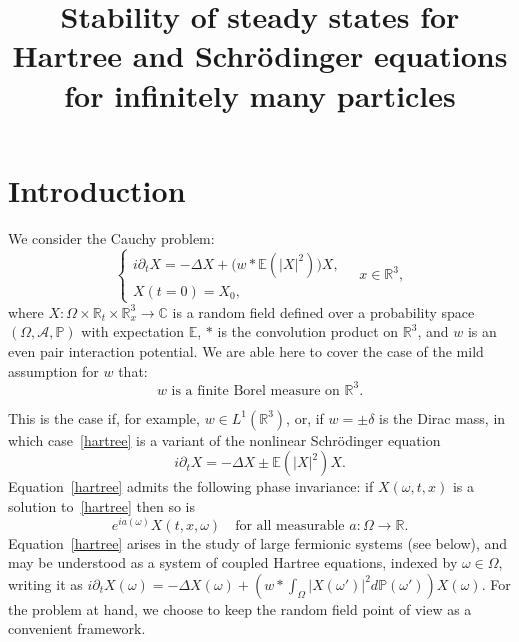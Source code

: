 \documentclass[AHL, Unicode, longabstracts,published]{cedram}
\title[Stability of steady states for Hartree and Schr\"odinger equations for infinitely many particles]{Stability of steady states for Hartree and Schr\"odinger equations for infinitely many particles}
\author[\initial{C.} \lastname{Collot}]{\firstname{Charles} \lastname{Collot}}
\author[\initial{A.-S.} \lastname{de Suzzoni}]{\firstname{Anne-Sophie} \lastname{de {\!}Suzzoni}}
\newcommand{\R}{\mathbb{R}}
\newcommand{\C}{\mathbb{C}}
\newcommand{\E}{\mathbb{E}}
\newcommand{\bbP}{\mathbb{P}}
\newcommand{\mclA}{\mathcal{A}}
\newcommand{\pa}{\partial}
\begin{document}
\maketitle
\tableofcontents



\section{Introduction}


We consider the Cauchy problem:
\begin{equation} \label{hartree}
\begin{cases}
i\partial_t X = -\Delta X + \big(w*\E\left(|X|^2\right)\big) X, \\
X(t=0) = X_0,
\end{cases} \quad x\in \R^3,
\end{equation}
where $X : \Omega \times \R_t \times \R^3_x\rightarrow \C$ is a random field defined over a probability space $(\Omega,\mclA, \bbP)$ with expectation $\E$, $*$ is the convolution product on $\R^3$, and $w$ is an even pair interaction potential. We are able here to cover the case of the mild assumption for $w$ that:
\begin{equation} \label{id:hpw}
w \text{ is a finite Borel measure on } \R^3.
\end{equation} 

This is the case if, for example, $w\in L^1(\R^3)$, or, if $w=\pm \delta$ is the Dirac mass, in which case~\eqref{hartree} is a variant of the nonlinear Schr\"odinger equation
\[
i\partial_t X = -\Delta X \pm \E\left(|X|^2\right) X.
\]
Equation~\eqref{hartree} admits the following phase invariance: if $X(\omega,t,x)$ is a solution to~\eqref{hartree} then so is
\begin{equation} \label{id:phase}
e^{ia(\omega)}X(t,x,\omega) \quad \text{for all measurable } a:\Omega \rightarrow \R.
\end{equation}
Equation~\eqref{hartree} arises in the study of large fermionic systems (see below), and may be understood as a system of coupled Hartree equations, indexed by $\omega \in \Omega$, writing it as $i\pa_t X(\omega)=-\Delta X(\omega)+(w*\int_{\Omega}|X(\omega')|^2d\bbP (\omega'))X(\omega)$. For the problem at hand, we choose to keep the random field point of view as a convenient framework.
\end{document}
